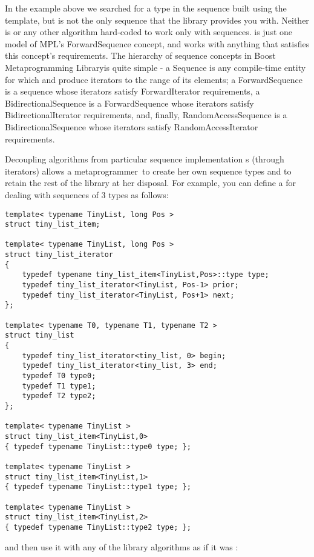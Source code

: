 \documentclass{netobjectdays}
\newcommand{\Mpl}{Boost Meta\-program\-ming Library}
\newcommand{\mpgmer}{meta\-program\-mer}
\begin{document}
In the  example above we searched for a type in the
sequence built using the  template, but
 is not the only sequence that the library provides you
with. Neither is or any other algorithm
hard-coded to work only with  sequences.  is
just one model of MPL's ForwardSequence concept, and  works
with anything that satisfies this concept's requirements. The
hierarchy of sequence concepts in \Mpl is quite simple - a Sequence is
any compile-time entity for which  and 
produce iterators to the range of its elements; a ForwardSequence is a
sequence whose iterators satisfy ForwardIterator requirements, a
BidirectionalSequence is a ForwardSequence whose iterators satisfy
BidirectionalIterator requirements, and, finally, RandomAccessSequence
is a BidirectionalSequence whose iterators satisfy
RandomAccessIterator requirements.

Decoupling algorithms from particular sequence implementation s
(through iterators) allows a \mpgmer\ to create her own sequence types
and to retain the rest of the library at her disposal. For example,
you can define a  for dealing with sequences of 3
types as follows:

{\footnotesize
\begin{verbatim}
template< typename TinyList, long Pos >
struct tiny_list_item;

template< typename TinyList, long Pos >
struct tiny_list_iterator
{
    typedef typename tiny_list_item<TinyList,Pos>::type type;
    typedef tiny_list_iterator<TinyList, Pos-1> prior;
    typedef tiny_list_iterator<TinyList, Pos+1> next;
};

template< typename T0, typename T1, typename T2 >
struct tiny_list
{
    typedef tiny_list_iterator<tiny_list, 0> begin;
    typedef tiny_list_iterator<tiny_list, 3> end;
    typedef T0 type0;
    typedef T1 type1;
    typedef T2 type2;
};

template< typename TinyList >
struct tiny_list_item<TinyList,0>
{ typedef typename TinyList::type0 type; };

template< typename TinyList >
struct tiny_list_item<TinyList,1>
{ typedef typename TinyList::type1 type; };

template< typename TinyList >
struct tiny_list_item<TinyList,2>
{ typedef typename TinyList::type2 type; };
\end{verbatim}
}

and then use it with any of the library algorithms as if it 
was :
\end{document}
